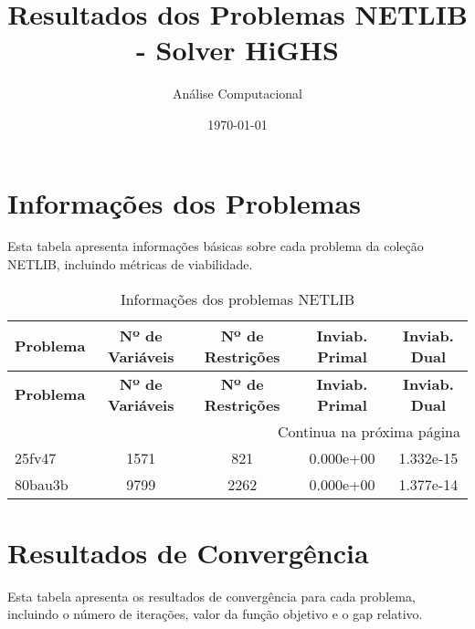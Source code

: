\documentclass[12pt]{article}
\title{Resultados dos Problemas NETLIB - Solver HiGHS}
\author{Análise Computacional}
\date{\today}
\begin{document}
\maketitle

\section{Informações dos Problemas}

Esta tabela apresenta informações básicas sobre cada problema da coleção NETLIB, incluindo métricas de viabilidade.

\scriptsize
\begin{longtable}{@{}l|cccc@{}}
\caption{Informações dos problemas NETLIB} \label{tab:info_problemas} \\
\toprule
\textbf{Problema} & \textbf{Nº de Variáveis} & \textbf{Nº de Restrições} & \textbf{Inviab. Primal} & \textbf{Inviab. Dual} \\
\midrule
\endfirsthead

\toprule
\textbf{Problema} & \textbf{Nº de Variáveis} & \textbf{Nº de Restrições} & \textbf{Inviab. Primal} & \textbf{Inviab. Dual} \\
\midrule
\endhead

\midrule \multicolumn{5}{r}{{Continua na próxima página}} \\ \midrule
\endfoot

\bottomrule
\endlastfoot
25fv47 & 1571 & 821 & 0.000e+00 & 1.332e-15 \\
80bau3b & 9799 & 2262 & 0.000e+00 & 1.377e-14 \\

\bottomrule
\end{longtable}

\section{Resultados de Convergência}

Esta tabela apresenta os resultados de convergência para cada problema, incluindo o número de iterações, valor da função objetivo e o gap relativo.
\end{document}
